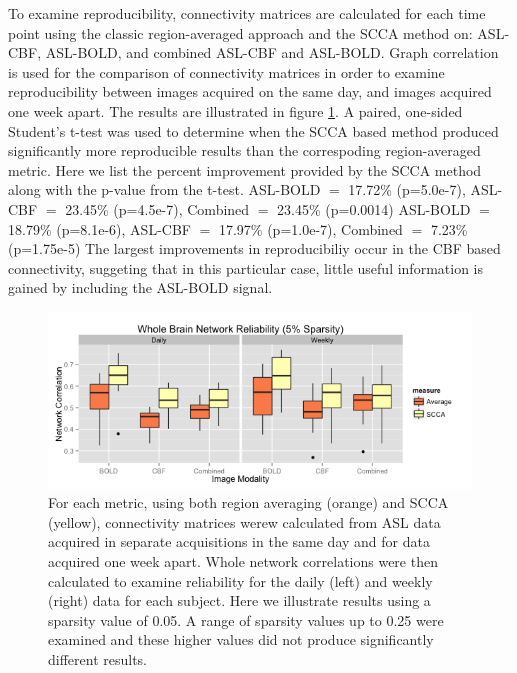 \documentclass{llncs}
\begin{document}
 To examine reproducibility, connectivity matrices are calculated for each time point using the classic region-averaged approach and the SCCA method on: ASL-CBF, ASL-BOLD, and combined ASL-CBF and ASL-BOLD. Graph correlation \cite{vanWijk2010} is used for the comparison of connectivity matrices in order to examine reproducibility between images acquired on the same day, and images acquired one week apart. The results are illustrated in figure \ref{fig:testretest}. A paired, one-sided Student's t-test was used to determine when the SCCA based method produced significantly more reproducible results than the correspoding region-averaged metric. Here we list the percent improvement provided by the SCCA method along with the p-value from the t-test. \newline
{} ASL-BOLD $=$ 17.72\% (p=5.0e-7), ASL-CBF $=$ 23.45\% (p=4.5e-7), Combined $=$ 23.45\% (p=0.0014) \newline
{} ASL-BOLD $=$ 18.79\% (p=8.1e-6), ASL-CBF $=$ 17.97\% (p=1.0e-7), Combined $=$ 7.23\% (p=1.75e-5) \newline
The largest improvements in reproducibiliy occur in the CBF based connectivity, suggeting that in this particular case, little useful information is gained by including the ASL-BOLD signal.

\begin{figure}[tb]
\begin{center}
\includegraphics[width=0.8\linewidth]{retest.png} 
\caption{For each metric, using both region averaging (orange) and SCCA (yellow), connectivity matrices werew calculated from ASL data acquired in separate acquisitions in the same day and for data acquired one week apart. Whole network correlations were then calculated to examine reliability for the daily (left) and weekly (right) data for each subject. Here we illustrate results using a sparsity value of 0.05. A range of sparsity values up to 0.25 were examined and these higher values did not produce significantly different results.}
\label{fig:testretest}
\end{center}
\end{figure}
\end{document}
